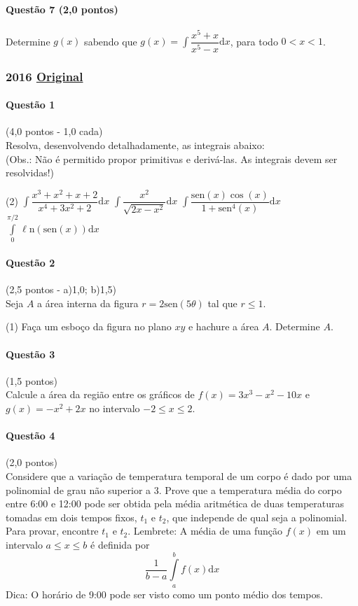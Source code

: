 \documentclass[12pt,a4paper]{article}
\newcommand{\sen}{\mathrm{sen}}
\newcommand{\dd}{\mathrm{d}}
\newcommand{\Ln}{\ell\mathrm{n}}
\newcommand{\original}[1]{\tiny \href{#1}{Original} \normalsize}
\begin{document}
\paragraph{Questão 7 (2,0 pontos)}

Determine $g(x)$ sabendo que $g(x) = \displaystyle\int \dfrac{x^5+x}{x^5-x}\dd x$, para todo $0<x<1$.
\newpage

\subsubsection{2016 \original{https://drive.google.com/file/d/163O-1F9ZUoMfhYYjooaRlV5GRodccLi5/view?usp=sharing}}

\paragraph{Questão 1} (4,0 pontos - 1,0 cada)\\
Resolva, desenvolvendo detalhadamente, as integrais abaixo:\\
\noindent(Obs.: Não é permitido propor primitivas e derivá-las. As integrais devem ser resolvidas!)
\begin{tasks}(2)
\task $\displaystyle\int \dfrac{x^3 + x^2 + x + 2}{x^4 + 3x^2 + 2} \dd x$
\task $\displaystyle \int \dfrac{x^2}{\sqrt{2x-x^2}}\dd x$
\task $\displaystyle \int \dfrac{\sen(x) \cos (x)}{1+\sen ^4 (x)}\dd x$
\task $\displaystyle\int\limits_0^{\pi / 2}\Ln\left( \sen (x) \right) \dd x$
\end{tasks}

\paragraph{Questão 2} (2,5 pontos - a)1,0; b)1,5)\\
Seja $A$ a área interna da figura $r=2\sen(5\theta)$ tal que $r\le 1$.
\begin{tasks}(1)
\task Faça um esboço da figura no plano $xy$ e hachure a área $A$. 
\task Determine $A$.
\end{tasks}

\paragraph{Questão 3} (1,5 pontos)\\
Calcule a área da região entre os gráficos de $f(x) = 3x^3 - x^2 - 10x$ e $g(x) = -x^2 + 2x$ no intervalo $-2\le x\le 2$.


\paragraph{Questão 4} (2,0 pontos)\\
Considere que a variação de temperatura temporal de um corpo é dado por uma polinomial de grau não superior a 3. Prove que a temperatura média do corpo entre 6:00 e 12:00 pode ser obtida pela média aritmética de duas temperaturas tomadas em dois tempos fixos, $t_1$ e $t_2$, que independe de qual seja a polinomial.
Para provar, encontre $t_1$ e $t_2$.
Lembrete: A média de uma função $f(x)$ em um intervalo $a\le x \le b$ é definida por $$\frac{1}{b-a}\displaystyle\int\limits_a^b f(x)\dd x$$Dica: O horário de 9:00 pode ser visto como um ponto médio dos tempos.
\end{document}
